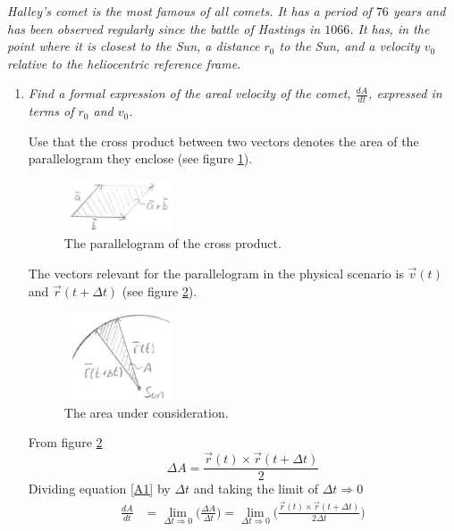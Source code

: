 \begin{example}
	\emph{Halley's comet is the most famous of all comets. It has a period of $76$ years and has been observed regularly since the battle of Hastings in $1066$. It has, in the point where it is closest to the Sun, a distance $r_0$ to the Sun, and a velocity $v_0$ relative to the heliocentric reference frame.}
	
	\begin{enumerate}
		\item \emph{Find a formal expression of the areal velocity of the comet, $\frac{dA}{dt}$, expressed in terms of $r_0$ and $v_0$.}
		
		Use that the cross product between two vectors denotes the area of the parallelogram they enclose (see figure \ref{fig:par}).
		\begin{figure}[h]
			\captionsetup{width=1\textwidth}
			\centering
			\includegraphics[width=0.3\textwidth]{figures/par}
			\caption{The parallelogram of the cross product.}
			\label{fig:par}
		\end{figure}
		The vectors relevant for the parallelogram in the physical scenario is $\vec{v}(t)$ and $\vec{r}(t+\Delta t)$ (see figure \ref{fig:par2}).
		\begin{figure}[h]
			\captionsetup{width=1\textwidth}
			\centering
			\includegraphics[width=0.3\textwidth]{figures/par2}
			\caption{The area under consideration.}
			\label{fig:par2}
		\end{figure}
		From figure \ref{fig:par2}
		\begin{equation}
			\Delta A=\frac{\vec{r}(t)\times \vec{r}(t+\Delta t)}{2}
			\label{A1}
		\end{equation} 
		Dividing equation \eqref{A1} by $\Delta t$ and taking the limit of $\Delta t\Rightarrow 0$
		\begin{equation}
			\begin{split}
				\frac{dA}{dt}&=\lim\limits_{\Delta t\Rightarrow 0}\bigg(\frac{\Delta A}{\Delta t}\bigg)=\lim\limits_{\Delta t\Rightarrow 0}\bigg(\frac{\vec{r}(t)\times \vec{r}(t+\Delta t)}{2\Delta t}\bigg)\\

\end{split}
\end{equation}
\end{enumerate}
\end{example}
